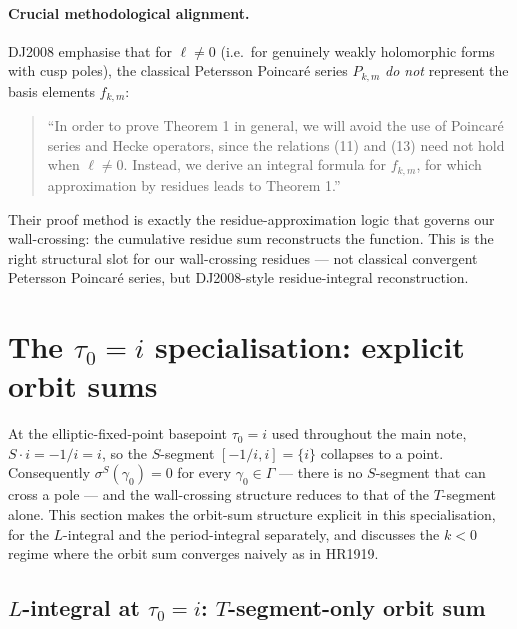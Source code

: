 \documentclass[11pt]{article}
\begin{document}
\paragraph{Crucial methodological alignment.}
DJ2008 emphasise that for $\ell \neq 0$ (i.e.\ for genuinely weakly
holomorphic forms with cusp poles), the classical Petersson Poincar\'e
series $P_{k, m}$ \emph{do not} represent the basis elements
$f_{k, m}$:
\begin{quote}
``In order to prove Theorem 1 in general, we will avoid the use of
Poincar\'e series and Hecke operators, since the relations (11) and
(13) need not hold when $\ell \neq 0$.  Instead, we derive an integral
formula for $f_{k, m}$, for which approximation by residues leads to
Theorem 1.''
\end{quote}
Their proof method is exactly the residue-approximation logic that
governs our wall-crossing: the cumulative residue sum reconstructs the
function.  This is the right structural slot for our wall-crossing
residues — not classical convergent Petersson Poincar\'e series, but
DJ2008-style residue-integral reconstruction.

\section{The $\tau_0 = i$ specialisation: explicit orbit sums}\label{sec:tau0-i-orbit}

At the elliptic-fixed-point basepoint $\tau_0 = i$ used throughout the
main note, $S \cdot i = -1/i = i$, so the $S$-segment $[-1/i, i] =
\{i\}$ collapses to a point.  Consequently $\sigma^S(\gamma_0) = 0$
for every $\gamma_0 \in \Gamma$ — there is no $S$-segment that can
cross a pole — and the wall-crossing structure reduces to that of the
$T$-segment alone.  This section makes the orbit-sum structure
explicit in this specialisation, for the $L$-integral and the
period-integral separately, and discusses the $k < 0$ regime where the
orbit sum converges naively as in HR1919.

\subsection{$L$-integral at $\tau_0 = i$: $T$-segment-only orbit sum}\label{subsec:L-tau0-i}
\end{document}
